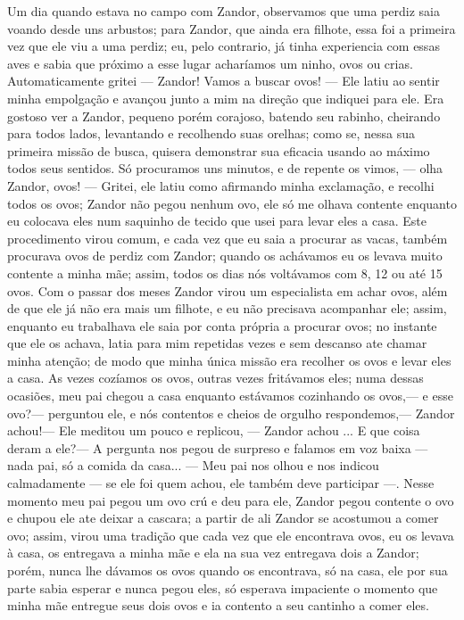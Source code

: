 Um dia quando estava no campo com Zandor, observamos que uma perdiz saia voando desde uns arbustos; para Zandor, que ainda era filhote, essa foi a primeira vez que ele viu a uma perdiz; eu, pelo contrario, já tinha experiencia com essas aves e sabia que próximo a esse lugar acharíamos um ninho, ovos ou crias. 
Automaticamente gritei --- Zandor! Vamos a buscar ovos! --- Ele latiu ao sentir minha empolgação e avançou junto a mim na direção que indiquei para ele. 
Era gostoso ver a Zandor, pequeno porém corajoso, batendo seu rabinho, cheirando para todos lados, levantando e recolhendo suas orelhas; como se, nessa sua primeira missão de busca, quisera demonstrar sua eficacia usando ao máximo todos seus sentidos. 
Só procuramos uns minutos, e de repente os vimos, --- olha Zandor, ovos! --- Gritei, ele latiu como afirmando minha exclamação, e recolhi todos os ovos; Zandor não pegou nenhum ovo, ele só me olhava contente enquanto eu colocava eles num saquinho de tecido que usei para levar eles a casa. 
Este procedimento virou comum, e cada vez que eu saia a procurar as vacas, também procurava ovos de perdiz com Zandor; quando os achávamos eu os levava muito contente a minha mãe; assim, todos os dias nós voltávamos com 8, 12 ou até 15 ovos. 
Com o passar dos meses Zandor virou um especialista em achar ovos, além de que ele já não era mais um filhote, e eu não precisava acompanhar ele; assim, enquanto eu trabalhava ele saia por conta própria a procurar ovos; no instante que ele os achava, latia para mim repetidas vezes e sem descanso ate chamar minha atenção; de modo que minha única missão era recolher os ovos e levar eles a casa.
As vezes cozíamos os ovos, outras vezes fritávamos eles; numa dessas ocasiões, meu pai chegou a casa enquanto estávamos cozinhando os ovos,--- e esse ovo?--- perguntou ele, e nós contentos e cheios de orgulho respondemos,--- Zandor achou!---
Ele meditou um pouco e replicou, --- Zandor achou ... E que coisa deram a ele?--- A pergunta nos pegou de surpreso e falamos em voz baixa --- nada pai, só a comida da casa... --- Meu pai nos olhou e nos indicou calmadamente --- se ele foi quem achou, ele também deve participar ---. 
Nesse momento meu pai pegou um ovo crú e deu para ele, Zandor pegou contente o ovo e chupou ele ate deixar a cascara; a partir de ali Zandor se acostumou a comer ovo; assim, virou uma tradição que cada vez que ele encontrava ovos, eu os levava à casa, os entregava a minha mãe e ela na sua vez entregava dois a Zandor; porém, nunca lhe dávamos os ovos quando os encontrava, só na casa, ele por sua parte sabia esperar e nunca pegou eles, só esperava impaciente o momento que minha mãe entregue seus dois ovos e ia contento a seu cantinho a comer eles.


